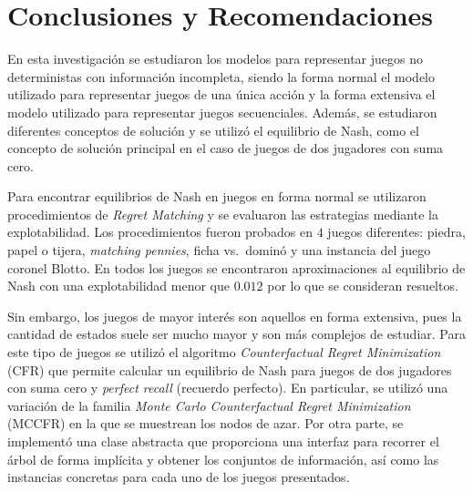 \chapter*{Conclusiones y Recomendaciones}

En esta investigación se estudiaron los modelos para representar juegos no deterministas con información incompleta, siendo la forma normal el modelo utilizado para representar juegos de una única acción y la forma extensiva el modelo utilizado para representar juegos secuenciales. Además, se estudiaron diferentes conceptos de solución y se utilizó el equilibrio de Nash, como el concepto de solución principal en el caso de juegos de dos jugadores con suma cero.

Para encontrar equilibrios de Nash en juegos en forma normal se utilizaron procedimientos de \textit{Regret Matching} y se evaluaron las estrategias mediante la explotabilidad. Los procedimientos fueron probados en $4$ juegos diferentes: piedra, papel o tijera, \textit{matching pennies}, ficha vs.\ dominó y una instancia del juego coronel Blotto. En todos los juegos se encontraron aproximaciones al equilibrio de Nash con una explotabilidad menor que $0.012$ por lo que se consideran resueltos.

Sin embargo, los juegos de mayor interés son aquellos en forma extensiva, pues la cantidad de estados suele ser mucho mayor y son más complejos de estudiar. Para este tipo de juegos se utilizó el algoritmo \textit{Counterfactual Regret Minimization} (CFR) que permite calcular un equilibrio de Nash para juegos de dos jugadores con suma cero y \textit{perfect recall} (recuerdo perfecto). En particular, se utilizó una variación de la familia \textit{Monte Carlo Counterfactual Regret Minimization} (MCCFR) en la que se muestrean los nodos de azar. Por otra parte, se implementó una clase abstracta que proporciona una interfaz para recorrer el árbol de forma implícita y obtener los conjuntos de información, así como las instancias concretas para cada uno de los juegos presentados.


